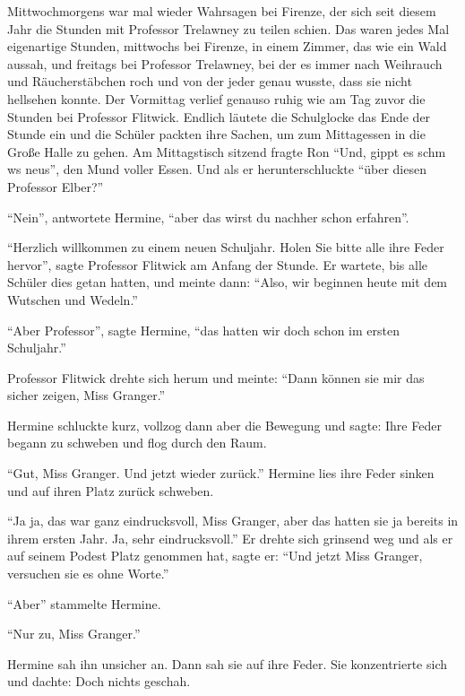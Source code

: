 Mittwochmorgens war mal wieder Wahrsagen bei Firenze, der sich seit diesem Jahr die Stunden mit Professor Trelawney zu teilen schien. Das waren jedes Mal eigenartige Stunden, mittwochs bei Firenze, in einem Zimmer, das wie ein Wald aussah, und freitags bei Professor Trelawney, bei der es immer nach Weihrauch und Räucherstäbchen roch und von der jeder genau wusste, dass sie nicht hellsehen konnte. Der Vormittag verlief genauso ruhig wie am Tag zuvor die Stunden bei Professor Flitwick. Endlich läutete die Schulglocke das Ende der Stunde ein und die Schüler packten ihre Sachen, um zum Mittagessen in die Große Halle zu gehen. Am Mittagstisch sitzend fragte Ron \enquote{Und, gippt es schm ws neus}, den Mund voller Essen. Und als er herunterschluckte \enquote{über diesen Professor Elber?}

\enquote{Nein}, antwortete Hermine, \enquote{aber das wirst du nachher schon erfahren}.

\trenn

\enquote{Herzlich willkommen zu einem neuen Schuljahr. Holen Sie bitte alle ihre Feder hervor}, sagte Professor Flitwick am Anfang der Stunde. Er wartete, bis alle Schüler dies getan hatten, und meinte dann: \enquote{Also, wir beginnen heute mit dem Wutschen und Wedeln.}

\enquote{Aber Professor}, sagte Hermine, \enquote{das hatten wir doch schon im ersten Schuljahr.}

Professor Flitwick drehte sich herum und meinte: \enquote{Dann können sie mir das sicher zeigen, Miss Granger.}

Hermine schluckte kurz, vollzog dann aber die Bewegung und sagte:  Ihre Feder begann zu schweben und flog durch den Raum.

\enquote{Gut, Miss Granger. Und jetzt wieder zurück.} Hermine lies ihre Feder sinken und auf ihren Platz zurück schweben.

\enquote{Ja ja, das war ganz eindrucksvoll, Miss Granger, aber das hatten sie ja bereits in ihrem ersten Jahr. Ja, sehr eindrucksvoll.} Er drehte sich grinsend weg und als er auf seinem Podest Platz genommen hat, sagte er: \enquote{Und jetzt Miss Granger, versuchen sie es ohne Worte.}

\enquote{Aber\abs} stammelte Hermine.

\enquote{Nur zu, Miss Granger.}

Hermine sah ihn unsicher an. Dann sah sie auf ihre Feder. Sie konzentrierte sich und dachte:  Doch nichts geschah.

